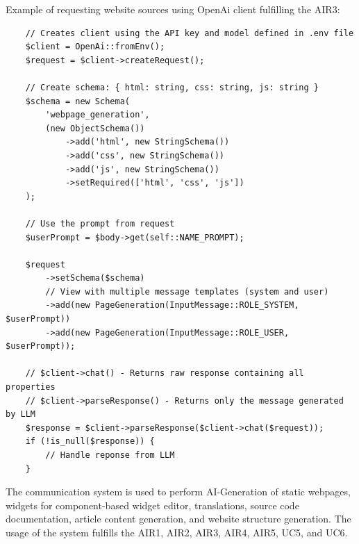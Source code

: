 Example of requesting website sources using OpenAi client fulfilling the AIR3:
\begin{verbatim}
    // Creates client using the API key and model defined in .env file
    $client = OpenAi::fromEnv();
    $request = $client->createRequest();

    // Create schema: { html: string, css: string, js: string }
    $schema = new Schema(
        'webpage_generation',
        (new ObjectSchema())
            ->add('html', new StringSchema())
            ->add('css', new StringSchema())
            ->add('js', new StringSchema())
            ->setRequired(['html', 'css', 'js'])
    );

    // Use the prompt from request
    $userPrompt = $body->get(self::NAME_PROMPT);

    $request
        ->setSchema($schema)
        // View with multiple message templates (system and user)
        ->add(new PageGeneration(InputMessage::ROLE_SYSTEM, $userPrompt))
        ->add(new PageGeneration(InputMessage::ROLE_USER, $userPrompt));

    // $client->chat() - Returns raw response containing all properties
    // $client->parseResponse() - Returns only the message generated by LLM
    $response = $client->parseResponse($client->chat($request));
    if (!is_null($response)) {
        // Handle reponse from LLM
    }
\end{verbatim}

The communication system is used to perform AI-Generation of static webpages, widgets for component-based widget editor,
translations, source code documentation, article content generation, and website structure generation.
The usage of the system fulfills the AIR1, AIR2, AIR3, AIR4, AIR5, UC5, and UC6.